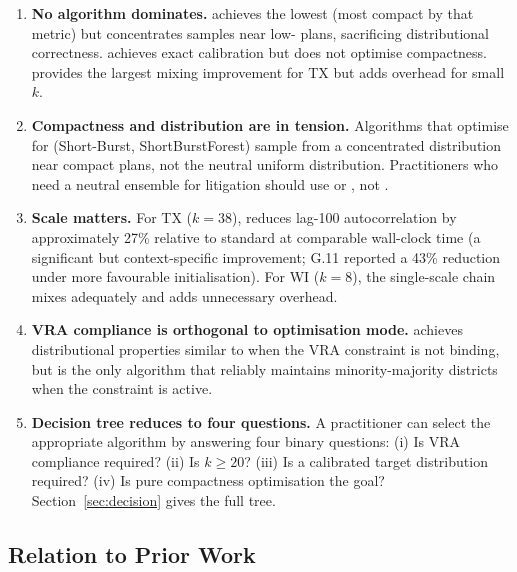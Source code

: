 \begin{enumerate}
  \item \textbf{No algorithm dominates.}
        \sburst{} achieves the lowest \ec{} (most compact by that metric)
        but concentrates samples near low-\ec{} plans, sacrificing
        distributional correctness.
        \smc{} achieves exact calibration but does not optimise
        compactness.
        \ms{} provides the largest mixing improvement for TX but adds
        overhead for small $k$.

  \item \textbf{Compactness and distribution are in tension.}
        Algorithms that optimise for \ec{} (Short-Burst, ShortBurstForest)
        sample from a concentrated distribution near compact plans, not the
        neutral uniform distribution.
        Practitioners who need a neutral ensemble for litigation should use
        \smc{} or \fr{}, not \sburst{}.

  \item \textbf{Scale matters.}
        For TX ($k = 38$), \ms{} reduces lag-100 autocorrelation by
        approximately 27\% relative to standard \recom{} at comparable
        wall-clock time (a significant but context-specific improvement;
        G.11 reported a 43\% reduction under more favourable initialisation).
        For WI ($k = 8$), the single-scale chain mixes adequately and
        \ms{} adds unnecessary overhead.

  \item \textbf{VRA compliance is orthogonal to optimisation mode.}
        \vra{} achieves distributional properties similar to \fr{}
        when the VRA constraint is not binding, but is the only algorithm
        that reliably maintains minority-majority districts when the
        constraint is active.

  \item \textbf{Decision tree reduces to four questions.}
        A practitioner can select the appropriate algorithm by answering
        four binary questions: (i) Is VRA compliance required? (ii) Is
        $k \geq 20$? (iii) Is a calibrated target distribution required?
        (iv) Is pure compactness optimisation the goal?
        Section~\ref{sec:decision} gives the full tree.
\end{enumerate}

\subsection{Relation to Prior Work}

